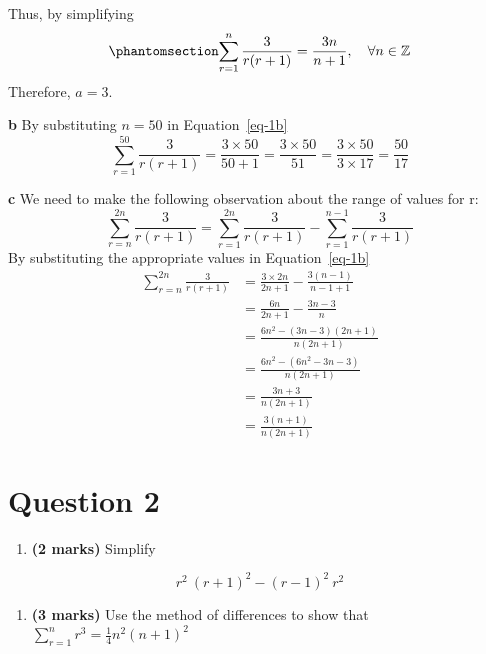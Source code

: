 \documentclass[
  a4paper,
]{report}
\providecommand{\tightlist}{%
  \setlength{\itemsep}{0pt}\setlength{\parskip}{0pt}}\usepackage{longtable,booktabs,array}
\begin{document}
\begin{tcolorbox}
Thus, by simplifying
\begin{equation}\phantomsection\label{eq-1b}{\sum_{r=1}^{n}\frac{3}{r(r+1)}=\frac{3n}{n+1}, \quad \forall n \in \mathbb{Z} }\end{equation}
Therefore, \(a=3\).

\textbf{b} By substituting \(n=50\) in Equation~\ref{eq-1b}
\[\sum_{r=1}^{50}\frac{3}{r(r+1)}=\frac{3\times50}{50+1}=\frac{3 \times 50}{51}=\frac{3\times50}{3 \times17}=\frac{50}{17}\]

\textbf{c} We need to make the following observation about the range of
values for r:
\[\sum_{r=n}^{2n}\frac{3}{r(r+1)}=\sum_{r=1}^{2n}\frac{3}{r(r+1)}-\sum_{r=1}^{n-1}\frac{3}{r(r+1)}\]
By substituting the appropriate values in Equation~\ref{eq-1b}
\begin{equation*}
\begin{split}
\sum_{r=n}^{2n}\frac{3}{r(r+1)} &= \frac{3 \times 2n}{2n+1}-\frac{3(n-1)}{n-1+1} \\
&= \frac{6n}{2n+1}-\frac{3n-3}{n} \\
&= \frac{6n^2-(3n-3)(2n+1)}{n(2n+1)}\\
&= \frac{6n^2-(6n^2-3n-3)}{n(2n+1)}\\
&=\frac{3n+3}{n(2n+1)}\\
&=\frac{3(n+1)}{n(2n+1)}
\end{split}
\end{equation*}

\end{tcolorbox}

\section{Question 2}\label{question-2}

\begin{enumerate}
\def\labelenumi{\alph{enumi}.}
\tightlist
\item
  \textbf{(2 marks)} Simplify
\end{enumerate}

\[r^2\ (r+1)^2-(r-1)^2\ r^2\]

\begin{enumerate}
\def\labelenumi{\alph{enumi}.}
\setcounter{enumi}{1}
\tightlist
\item
  \textbf{(3 marks)} Use the method of differences to show that
  \(\sum_{r=1}^{n}r^3=\frac{1}{4}n^2(n+1)^2\)
\end{enumerate}
\end{document}
